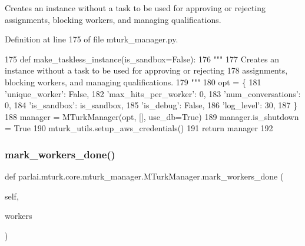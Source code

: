 \begin{DoxyVerb}Creates an instance without a task to be used for approving or rejecting
assignments, blocking workers, and managing qualifications.
\end{DoxyVerb}
 

Definition at line 175 of file mturk\+\_\+manager.\+py.


\begin{DoxyCode}
175     \textcolor{keyword}{def }make\_taskless\_instance(is\_sandbox=False):
176         \textcolor{stringliteral}{"""}
177 \textcolor{stringliteral}{        Creates an instance without a task to be used for approving or rejecting}
178 \textcolor{stringliteral}{        assignments, blocking workers, and managing qualifications.}
179 \textcolor{stringliteral}{        """}
180         opt = \{
181             \textcolor{stringliteral}{'unique\_worker'}: \textcolor{keyword}{False},
182             \textcolor{stringliteral}{'max\_hits\_per\_worker'}: 0,
183             \textcolor{stringliteral}{'num\_conversations'}: 0,
184             \textcolor{stringliteral}{'is\_sandbox'}: is\_sandbox,
185             \textcolor{stringliteral}{'is\_debug'}: \textcolor{keyword}{False},
186             \textcolor{stringliteral}{'log\_level'}: 30,
187         \}
188         manager = MTurkManager(opt, [], use\_db=\textcolor{keyword}{True})
189         manager.is\_shutdown = \textcolor{keyword}{True}
190         mturk\_utils.setup\_aws\_credentials()
191         \textcolor{keywordflow}{return} manager
192 
\end{DoxyCode}
\mbox{\label{classparlai_1_1mturk_1_1core_1_1mturk__manager_1_1MTurkManager_aeddd0db97149313d3a5fcf04e78c42f5}} 
\subsubsection{\texorpdfstring{mark\+\_\+workers\+\_\+done()}{mark\_workers\_done()}}
{\footnotesize\ttfamily def parlai.\+mturk.\+core.\+mturk\+\_\+manager.\+M\+Turk\+Manager.\+mark\+\_\+workers\+\_\+done (\begin{DoxyParamCaption}\item[{}]{self,  }\item[{}]{workers }\end{DoxyParamCaption})}

